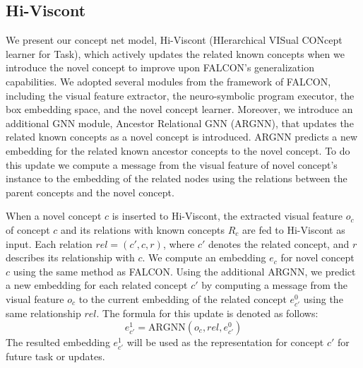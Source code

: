 \subsection{Hi-Viscont}
We present our concept net model, Hi-Viscont (HIerarchical VISual CONcept learner for Task), which actively updates the related known concepts when we introduce the novel concept to improve upon FALCON's generalization capabilities.
We adopted several modules from the framework of FALCON, including the visual feature extractor, the neuro-symbolic program executor, the box embedding space, and the novel concept learner.
Moreover, we introduce an additional GNN module, Ancestor Relational GNN (ARGNN), that updates the related known concepts as a novel concept is introduced. 
ARGNN predicts a new embedding for the related known ancestor concepts to the novel concept. To do this update we compute a message from the visual feature of novel concept's instance to the embedding of the related nodes using the relations between the parent concepts and the novel concept.


When a novel concept $c$ is inserted to Hi-Viscont, the extracted visual feature $o_c$ of concept $c$ and its relations with known concepts $R_c$ are fed to Hi-Viscont as input. 
Each relation $rel=(c',c, r)$, where $c'$ denotes the related concept, and $r$ describes its relationship with $c$.
We compute an embedding $e_c$ for novel concept $c$ using the same method as FALCON.
Using the additional ARGNN, we predict a new embedding for each related concept $c'$ by computing a message from the visual feature $o_c$ to the current embedding of the related concept $e_{c'}^0$ using the same relationship $rel$.
The formula for this update is denoted as follows: $$e_{c'}^1 = \textrm{ARGNN}(o_c, rel, e_{c'}^0)$$
The resulted embedding $e_{c'}^1$ will be used as the representation for concept $c'$ for future task or updates.



